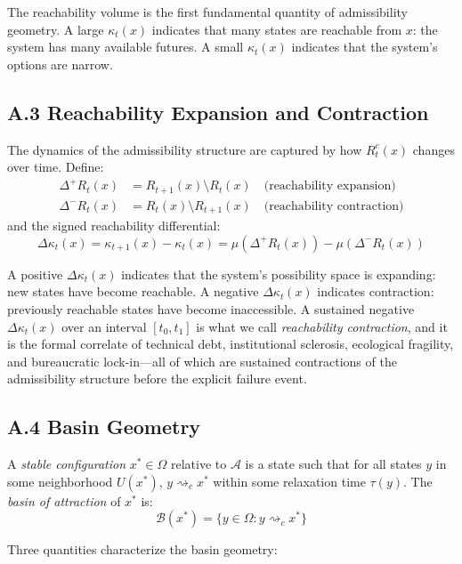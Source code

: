 \documentclass[12pt, a4paper]{article}
\theoremstyle{plain}
\theoremstyle{definition}
\theoremstyle{remark}
\begin{document}
The reachability volume is the first fundamental quantity of admissibility
geometry. A large $\kappa_t(x)$ indicates that many states are reachable
from $x$: the system has many available futures. A small $\kappa_t(x)$
indicates that the system's options are narrow.

\subsection*{A.3 Reachability Expansion and Contraction}

The dynamics of the admissibility structure are captured by how $R_t^c(x)$
changes over time. Define:
\begin{align}
\Delta^+ R_t(x) &= R_{t+1}(x) \setminus R_t(x) \quad \text{(reachability expansion)} \\
\Delta^- R_t(x) &= R_t(x) \setminus R_{t+1}(x) \quad \text{(reachability contraction)}
\end{align}
and the signed reachability differential:
$$\Delta\kappa_t(x) = \kappa_{t+1}(x) - \kappa_t(x) = \mu(\Delta^+ R_t(x)) - \mu(\Delta^- R_t(x))$$

A positive $\Delta\kappa_t(x)$ indicates that the system's possibility space
is expanding: new states have become reachable. A negative $\Delta\kappa_t(x)$
indicates contraction: previously reachable states have become inaccessible.
A sustained negative $\Delta\kappa_t(x)$ over an interval $[t_0, t_1]$ is
what we call \emph{reachability contraction}, and it is the formal correlate
of technical debt, institutional sclerosis, ecological fragility, and
bureaucratic lock-in---all of which are sustained contractions of the
admissibility structure before the explicit failure event.

\subsection*{A.4 Basin Geometry}

A \emph{stable configuration} $x^* \in \Omega$ relative to $\mathcal{A}$
is a state such that for all states $y$ in some neighborhood $U(x^*)$,
$y \rightsquigarrow_c x^*$ within some relaxation time $\tau(y)$.
The \emph{basin of attraction} of $x^*$ is:
$$\mathcal{B}(x^*) = \{y \in \Omega : y \rightsquigarrow_c x^*\}$$

Three quantities characterize the basin geometry:
\end{document}
